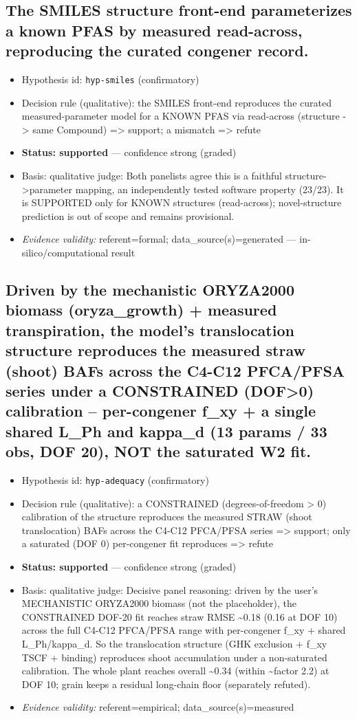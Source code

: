\documentclass{article}
\begin{document}
\subsection{The SMILES structure front-end parameterizes a known PFAS by measured read-across, reproducing the curated congener record.}
\begin{itemize}
  \item Hypothesis id: \texttt{hyp-smiles} (confirmatory)
  \item Decision rule (qualitative): the SMILES front-end reproduces the curated measured-parameter model for a KNOWN PFAS via read-across (structure -> same Compound) => support; a mismatch => refute
  \item \textbf{Status: supported} --- confidence strong (graded)
  \item Basis: qualitative judge: Both panelists agree this is a faithful structure->parameter mapping, an independently tested software property (23/23). It is SUPPORTED only for KNOWN structures (read-across); novel-structure prediction is out of scope and remains provisional.
  \item \textit{Evidence validity:} referent=formal; data\_source(s)=generated --- in-silico/computational result
\end{itemize}

\subsection{Driven by the mechanistic ORYZA2000 biomass (oryza\_growth) + measured transpiration, the model's translocation structure reproduces the measured straw (shoot) BAFs across the C4-C12 PFCA/PFSA series under a CONSTRAINED (DOF>0) calibration -- per-congener f\_xy + a single shared L\_Ph and kappa\_d (13 params / 33 obs, DOF 20), NOT the saturated W2 fit.}
\begin{itemize}
  \item Hypothesis id: \texttt{hyp-adequacy} (confirmatory)
  \item Decision rule (qualitative): a CONSTRAINED (degrees-of-freedom > 0) calibration of the structure reproduces the measured STRAW (shoot translocation) BAFs across the C4-C12 PFCA/PFSA series => support; only a saturated (DOF 0) per-congener fit reproduces => refute
  \item \textbf{Status: supported} --- confidence strong (graded)
  \item Basis: qualitative judge: Decisive panel reasoning: driven by the user's MECHANISTIC ORYZA2000 biomass (not the placeholder), the CONSTRAINED DOF-20 fit reaches straw RMSE \textasciitilde{}0.18 (0.16 at DOF 10) across the full C4-C12 PFCA/PFSA range with per-congener f\_xy + shared L\_Ph/kappa\_d. So the translocation structure (GHK exclusion + f\_xy TSCF + binding) reproduces shoot accumulation under a non-saturated calibration. The whole plant reaches overall \textasciitilde{}0.34 (within \textasciitilde{}factor 2.2) at DOF 10; grain keeps a residual long-chain floor (separately refuted).
  \item \textit{Evidence validity:} referent=empirical; data\_source(s)=measured
\end{itemize}
\end{document}
